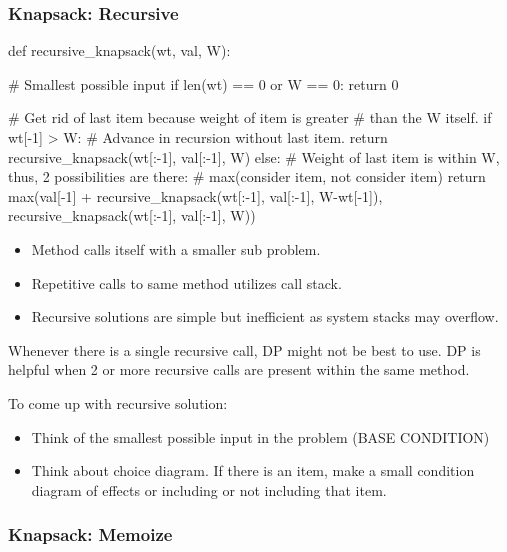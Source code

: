 \documentclass[12pt]{article}
\begin{document}
\subsubsection{Knapsack: Recursive}

\begin{python}
def recursive_knapsack(wt, val, W):

    # Smallest possible input
    if len(wt) == 0 or W == 0:
        return 0

    # Get rid of last item because weight of item is greater
    # than the W itself.
    if wt[-1] > W:
        # Advance in recursion without last item.
        return recursive_knapsack(wt[:-1], val[:-1], W)
    else:
        # Weight of last item is within W, thus, 2 possibilities are there:
        # max(consider item, not consider item)
        return max(val[-1] + recursive_knapsack(wt[:-1], val[:-1], W-wt[-1]),
                   recursive_knapsack(wt[:-1], val[:-1], W))
\end{python}

\begin{itemize}
\item Method calls itself with a smaller sub problem.
\item Repetitive calls to same method utilizes call stack. 
\item Recursive solutions are simple but inefficient as system stacks may overflow. 
\end{itemize}

Whenever there is a single recursive call, DP might not be best to use. DP is helpful when 2 or more recursive calls are present within the same method.

To come up with recursive solution:
\begin{itemize}
\item Think of the smallest possible input in the problem (BASE CONDITION)
\item Think about choice diagram. If there is an item, make a small condition diagram of effects or including or not including that item.

\end{itemize}

\pagebreak
\subsubsection{Knapsack: Memoize}
\end{document}
